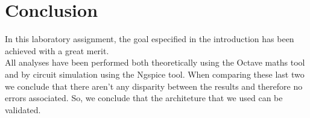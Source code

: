\section{Conclusion}
\label{sec:conclusion}

In this laboratory assignment, the goal especified in the introduction has been achieved with a great merit.\\
All analyses have been performed both theoretically using the Octave maths tool and by circuit simulation using the
Ngspice tool. When comparing these last two we conclude that there aren't any disparity between the results and therefore no errors associated.
So, we conclude that the architeture that we used can be validated.

